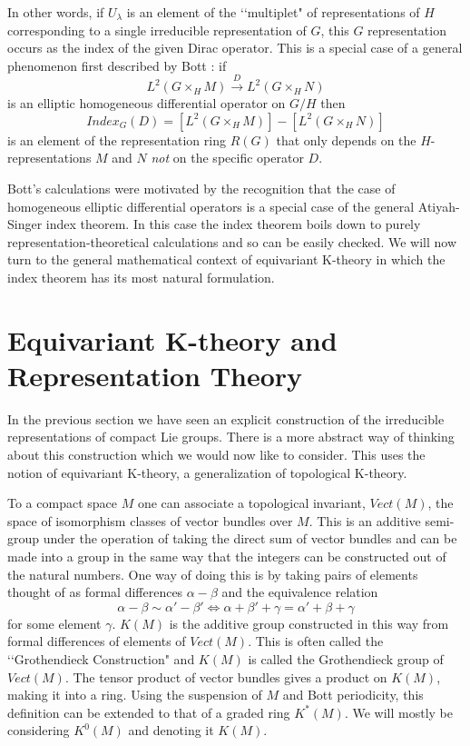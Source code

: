\documentclass[a4paper,a4paper]{article}
\theoremstyle{conjecture}
\begin{document}
In other words, if $U_\lambda$ is an element of the \lq\lq multiplet" of representations
of $H$ corresponding to a single irreducible representation of $G$, this $G$
representation occurs as the index of the given Dirac operator.  This is a special
case of a general phenomenon first described by Bott \cite{Bott2}: if
$$L^2(G\times_H M)\stackrel{D}\longrightarrow L^2(G\times_H N)$$
is an elliptic homogeneous differential operator on $G/H$ then
$$Index_G(D)=[L^2(G\times_H M)]-[L^2(G\times_H N)]$$
is an element of the representation ring $R(G)$ that only depends on the
$H$-representations $M$ and $N$ {\it{not}} on the specific operator $D$.

Bott's calculations were motivated by the recognition that the case
of homogeneous elliptic differential operators is a special case
of the general Atiyah-Singer index theorem.  In this case the index
theorem boils down to purely representation-theoretical calculations
and so can be easily checked.  We will now turn to the general
mathematical context of equivariant K-theory in which the index
theorem has its most natural formulation.


\section{Equivariant K-theory and Representation Theory}

In the previous section we have seen an explicit construction
of the irreducible representations of compact Lie groups.
There is a more abstract way of thinking about this construction
which we would now like to consider.  This uses the notion
of equivariant K-theory, a generalization of topological K-theory.

To a compact space $M$ one can associate a topological invariant,
$Vect(M)$, the space of isomorphism classes of vector
bundles over $M$.  This is an additive semi-group under the operation
of taking the direct sum of vector bundles and can be made into
a group in the same way that the integers can be constructed out of the
natural numbers.  One way of doing this is by taking pairs of elements
thought of as formal differences $\alpha - \beta$ and the equivalence
relation
$$\alpha - \beta \sim \alpha'-\beta' \Leftrightarrow \alpha + \beta' +\gamma = \alpha'+\beta +\gamma$$
for some element $\gamma$.  $K(M)$ is the additive group constructed in this
way
from formal differences of elements of $Vect(M)$. This is often called
the \lq\lq Grothendieck Construction" and $K(M)$ is called the Grothendieck group
of $Vect(M)$.
The tensor product of vector bundles gives a product on $K(M)$, making it
into a ring.  Using the suspension of $M$ and Bott periodicity, this definition
can be extended to that of a graded ring $K^*(M)$.  We will mostly be considering
$K^0(M)$ and denoting it $K(M)$.
\end{document}

